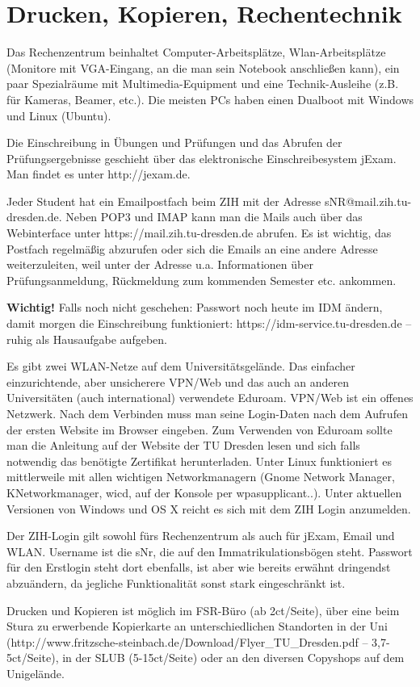 \documentclass[a4paper,12pt]{report}
\begin{document}
\section{Drucken, Kopieren, Rechentechnik}
\begin{itemize*}
\item Das Rechenzentrum beinhaltet Computer-Arbeitsplätze, Wlan-Arbeitsplätze (Monitore mit VGA-Eingang, an die man sein Notebook anschließen kann), ein paar Spezialräume mit Multimedia-Equipment und eine Technik-Ausleihe (z.B. für Kameras, Beamer, etc.). Die meisten PCs haben einen Dualboot mit Windows und Linux (Ubuntu).
\item Die Einschreibung in Übungen und Prüfungen und das Abrufen der Prüfungsergebnisse geschieht über das elektronische Einschreibesystem jExam. Man findet es unter http://jexam.de.
\item Jeder Student hat ein Emailpostfach beim ZIH mit der Adresse sNR@mail.zih.tu-dresden.de. Neben POP3 und IMAP kann man die Mails auch über das Webinterface unter https://mail.zih.tu-dresden.de abrufen. Es ist wichtig, das Postfach regelmäßig abzurufen oder sich die Emails an eine andere Adresse weiterzuleiten, weil unter der Adresse u.a. Informationen über Prüfungsanmeldung, Rückmeldung zum kommenden Semester etc. ankommen.
\item \textbf{Wichtig!} Falls noch nicht geschehen: Passwort noch heute im IDM ändern, damit morgen die Einschreibung funktioniert: https://idm-service.tu-dresden.de -- ruhig als Hausaufgabe aufgeben.
\item Es gibt zwei WLAN-Netze auf dem Universitätsgelände. Das einfacher einzurichtende, aber unsicherere VPN/Web und das auch an anderen Universitäten (auch international) verwendete Eduroam. VPN/Web ist ein offenes Netzwerk. Nach dem Verbinden muss man seine Login-Daten nach dem Aufrufen der ersten Website im Browser eingeben. Zum Verwenden von Eduroam sollte man die Anleitung auf der Website der TU Dresden lesen und sich falls notwendig das benötigte Zertifikat herunterladen. Unter Linux funktioniert es mittlerweile mit allen wichtigen Networkmanagern (Gnome Network Manager, KNetworkmanager, wicd, auf der Konsole per wpasupplicant..). Unter aktuellen Versionen von Windows und OS X reicht es sich mit dem ZIH Login anzumelden.
\item Der ZIH-Login gilt sowohl fürs Rechenzentrum als auch für jExam, Email und WLAN. Username ist die \glqq sNr\grqq, die auf den Immatrikulationsbögen steht. Passwort für den Erstlogin steht dort ebenfalls, ist aber wie bereits erwähnt dringendst abzuändern, da jegliche Funktionalität sonst stark eingeschränkt ist.
\item Drucken und Kopieren ist möglich im FSR-Büro (ab 2ct/Seite), über eine beim Stura zu erwerbende Kopierkarte an unterschiedlichen Standorten in der Uni (http://www.fritzsche-steinbach.de/Download/Flyer\_TU\_Dresden.pdf -- 3,7-5ct/Seite), in der SLUB (5-15ct/Seite) oder an den diversen Copyshops auf dem Unigelände.
\end{itemize*}
\end{document}
